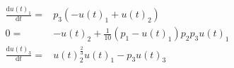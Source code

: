 \begin{align}
\frac{\mathrm{d} u\left( t \right)_{1}}{\mathrm{d}t} =& p_{3} \left(  - u\left( t \right)_{1} + u\left( t \right)_{2} \right) \\
0 =&  - u\left( t \right)_{2} + \frac{1}{10} \left( p_{1} - u\left( t \right)_{1} \right) p_{2} p_{3} u\left( t \right)_{1} \\
\frac{\mathrm{d} u\left( t \right)_{3}}{\mathrm{d}t} =& u\left( t \right)_{2}^{\frac{2}{3}} u\left( t \right)_{1} - p_{3} u\left( t \right)_{3}
\end{align}
